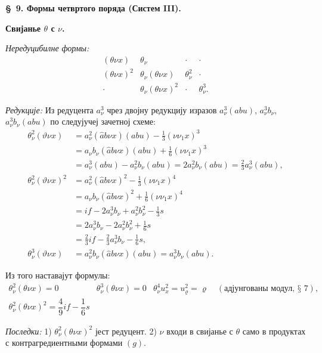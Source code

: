 ﻿\documentclass[11pt]{article}
\begin{document}
\begin{center}
\textbf{\S\ 9. \quad Формы четвртого поряда (Систем III).}
\end{center}

\noindent\textbf{Свијанье $\theta$ с $\nu$.}

\noindent\textit{Нередуцибилне формы:}
\[
\begin{array}{cccc}
(\theta\nu x)&\theta_\nu&\cdot&\cdot\\
(\theta\nu x)^2&\theta_\nu(\theta\nu x)&\theta_\nu^2&\cdot\\
\cdot&\theta_\nu(\theta\nu x)^2&\cdot&\theta_\nu^3.
\end{array}
\]

\noindent\textit{Редукције:} Из редуцента $a_\nu^3$ чрез двојну редукцију изразов $a_\nu^3(abu)$, $a_\nu^3b_\nu$, $a_\nu^3b_\nu(abu)$ по следујучеј зачетној схеме:
\[
\begin{aligned}
\theta_\nu^2(\vartheta\nu x)
&=a_\nu^2(\widehat{a}b\nu x)(abu)-\frac13(\nu\nu_1x)^3\\
&=a_\nu b_\nu(\widehat{a}b\nu x)(abu)+\frac16(\nu\nu_1x)^3\\
&=a_\nu^3(abu)-a_\nu^2b_\nu(abu)
=2a_\nu^2b_\nu(abu)=\frac23a_\nu^3(abu),\\[0.4em]
\theta_\nu^2(\vartheta\nu x)^2
&=a_\nu^2(\widehat{a}b\nu x)^2-\frac13(\nu\nu_1x)^4\\
&=a_\nu b_\nu(\widehat{a}b\nu x)^2+\frac16(\nu\nu_1x)^4\\
&=if-2a_\nu^3b_\nu+a_\nu^2b_\nu^2-\frac13s\\
&=2a_\nu^3b_\nu-2a_\nu^2b_\nu^2+\frac16s\\
&=\frac23if-\frac23a_\nu^3b_\nu-\frac16s,\\[0.4em]
\theta_\nu^3(\vartheta\nu x)
&=a_\nu^2b_\nu(\widehat{a}b\nu x)(abu)=a_\nu^3b_\nu(abu).
\end{aligned}
\]

Из того наставајут формулы:
\[
\tag{9}
\begin{array}{c|c|c}
\theta_\nu^2(\theta\nu x)=0
& \theta_\nu^3(\theta\nu x)=0
& \theta_\nu^4u_x^2=u_\varrho^2=\varrho\quad(\text{адјунгованы модул, § 7}),\\[0.6em]
\theta_\nu^2(\theta\nu x)^2=\dfrac49 i f-\dfrac16s
& &
\end{array}
\]

\noindent\textit{Последки:} 1) $\theta_\nu^2(\theta\nu x)^2$ јест редуцент. 2) $\nu$ входи в свијанье с $\theta$ само в продуктах с контрагредиентными формами $(g)$.
\end{document}
